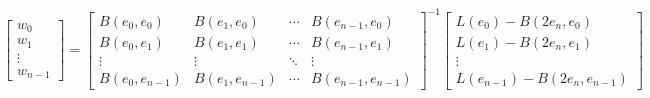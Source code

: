 \documentclass[a4paper,12pt]{article}
\begin{document}
    {\scriptsize
    \begin{equation}
        \begin{bmatrix}
            w_0 \\
            w_1 \\
            \vdots \\
            w_{n-1}
        \end{bmatrix}
        =
        \begin{bmatrix}
            B\left(e_0, e_0\right) & B\left(e_1, e_0\right) & \cdots & B\left(e_{n-1}, e_0\right) \\
            B\left(e_0, e_1\right) & B\left(e_1, e_1\right) & \cdots & B\left(e_{n-1}, e_1\right) \\
            \vdots & \vdots & \ddots & \vdots \\
            B\left(e_0, e_{n-1}\right) & B\left(e_1, e_{n-1}\right) & \cdots & B\left(e_{n-1}, e_{n-1}\right)
        \end{bmatrix}
        ^{-1}
        \begin{bmatrix}
            L\left(e_0\right)-B\left(2e_n, e_0\right) \\
            L\left(e_1\right)-B\left(2e_n, e_1\right) \\
            \vdots \\
            L\left(e_{n-1}\right)-B\left(2e_n, e_{n-1}\right)
        \end{bmatrix} \label{matrix_solution}
    \end{equation}
    }
\end{document}
